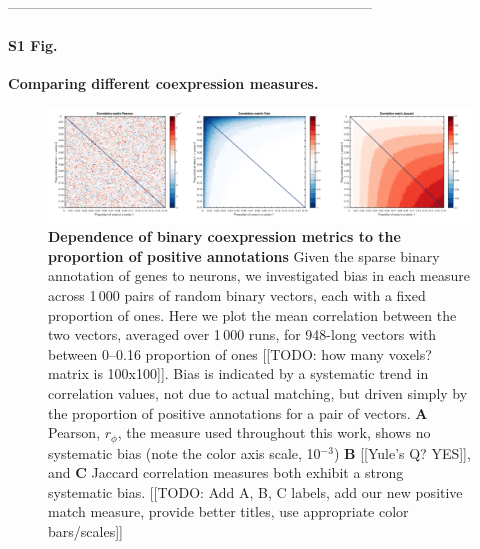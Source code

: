 \documentclass[10pt,letterpaper]{article}
\begin{document}
  ------------------------------------------------------------------------------


\paragraph*{S1 Fig.}
{\bf Comparing different coexpression measures.}
\begin{figure}[h]
\centering
    \includegraphics[width=1\textwidth]{CoexpressionMeasures.pdf}
\caption{
\label{fig:S_propOnes}
\textbf{Dependence of binary coexpression metrics to the proportion of positive annotations}
Given the sparse binary annotation of genes to neurons, we investigated bias in each measure across 1\,000 pairs of random binary vectors, each with a fixed proportion of ones.
Here we plot the mean correlation between the two vectors, averaged over 1\,000 runs, for 948-long vectors with between 0--0.16 proportion of ones [[TODO: how many voxels?matrix is 100x100]].
Bias is indicated by a systematic trend in correlation values, not due to actual matching, but driven simply by the proportion of positive annotations for a pair of vectors.
\textbf{A} Pearson, $r_\phi$, the measure used throughout this work, shows no systematic bias (note the color axis scale, 10$^{-3}$)
\textbf{B} [[Yule's Q? YES]], and \textbf{C} Jaccard correlation measures both exhibit a strong systematic bias.
[[TODO: Add A, B, C labels, add our new positive match measure, provide better titles, use appropriate color bars/scales]]
}
\end{figure}


\end{document}
